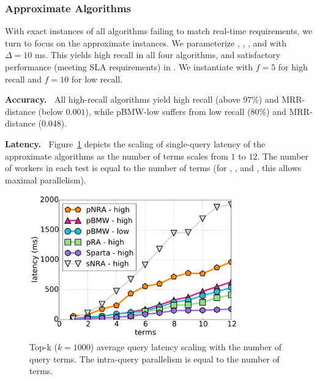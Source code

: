 \subsubsection{Approximate Algorithms}
 
With  exact instances of all  algorithms failing to match  real-time requirements, we turn to focus on the approximate instances. 
We parameterize \alg, \pRA, \pNRA, and \sNRA\/ with $\Delta=10$ ms. 
This yields high recall in all four algorithms,  and satisfactory performance (meeting SLA requirements) in \alg. 
We instantiate \pBMW\/ with $f=5$ for high recall and $f=10$ for low recall.  

{\bf Accuracy.\ } All high-recall algorithms yield high recall (above $97\%$) and MRR-distance  (below $0.001$), while pBMW-low  suffers from low recall ($80\%$) and MRR-distance (0.048).


{\bf Latency.\ } 
Figure~\ref{fig:terms-scaling} depicts the scaling of single-query latency of the approximate algorithms  
as the number of terms scales from $1$ to $12$. The number of workers in each test 
is equal to the number of terms (for \alg, \pRA, and \pNRA, this allows maximal parallelism). 



\begin{figure}[tbh]
\centering
\includegraphics[width=9cm]{figures/latency_12threads_clueweb.pdf}
\caption{\small Top-k ($k=1000$) average query latency scaling with the number of query terms. 
The intra-query parallelism is equal to the number of terms. }
\label{fig:terms-scaling}
\end{figure}

